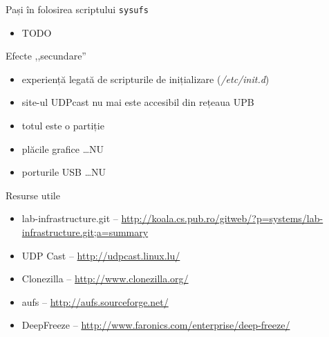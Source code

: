 \documentclass{beamer}
\begin{document}
\begin{frame}{Pași în folosirea scriptului \texttt{sysufs}}
  \begin{itemize}
    \item TODO
  \end{itemize}
\end{frame}

\begin{frame}{Efecte ,,secundare''}
  \begin{itemize}
    \item experiență legată de scripturile de inițializare
      (\textit{/etc/init.d})
    \item site-ul UDPcast nu mai este accesibil din rețeaua UPB
    \item totul este o partiție
    \item plăcile grafice \ldots NU
    \item porturile USB \ldots NU
  \end{itemize}
\end{frame}

\begin{frame}{Resurse utile}
  \begin{itemize}
    \item lab-infrastructure.git --
      \url{http://koala.cs.pub.ro/gitweb/?p=systems/lab-infrastructure.git;a=summary}
    \item UDP Cast -- \url{http://udpcast.linux.lu/}
    \item Clonezilla -- \url{http://www.clonezilla.org/}
    \item aufs -- \url{http://aufs.sourceforge.net/}
    \item DeepFreeze -- \url{http://www.faronics.com/enterprise/deep-freeze/}
  \end{itemize}
\end{frame}
\end{document}
